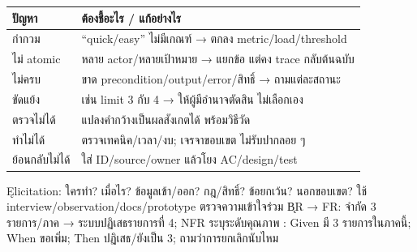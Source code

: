 {\smalltable\begin{tabularx}{\linewidth}{|p{10mm}|Y|}\hline
{}ปัญหา & ต้องชี้อะไร / แก้อย่างไร\\\hline
กำกวม & “quick/easy” ไม่มีเกณฑ์ → ตกลง metric/load/threshold\\\hline
ไม่ atomic & หลาย actor/หลายเป้าหมาย → แยกข้อ แต่คง trace กลับต้นฉบับ\\\hline
ไม่ครบ & ขาด precondition/output/error/สิทธิ์ → ถามแต่ละสถานะ\\\hline
ขัดแย้ง & เช่น limit 3 กับ 4 → ให้ผู้มีอำนาจตัดสิน ไม่เลือกเอง\\\hline
ตรวจไม่ได้ & แปลงคำกว้างเป็นผลสังเกตได้ พร้อมวิธีวัด\\\hline
ทำไม่ได้ & ตรวจเทคนิค/เวลา/งบ; เจรจาขอบเขต ไม่รับปากลอย ๆ\\\hline
ย้อนกลับไม่ได้ & ใส่ ID/source/owner แล้วโยง AC/design/test\\\hline
\end{tabularx}}
\k{Elicitation}: ใครทำ? เมื่อไร? ข้อมูลเข้า/ออก? กฎ/สิทธิ์? ข้อยกเว้น? นอกขอบเขต? ใช้ interview/observation/docs/prototype ตรวจความเข้าใจร่วม
\k{BR → FR}: จำกัด 3 รายการ/ภาค → ระบบปฏิเสธรายการที่ 4; NFR ระบุระดับคุณภาพ
\extra {}: Given มี 3 รายการในภาคนี้; When ขอเพิ่ม; Then ปฏิเสธ/ยังเป็น 3; ถามว่าการยกเลิกนับไหม
